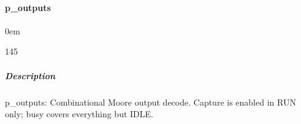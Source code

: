 \documentclass[letterpaper,10pt,english]{sphinxmanual}
\begin{document}
\sphinxstepscope


\paragraph{p\_outputs}
\label{\detokenize{modules/sample_ctrl/processes/p_outputs:p-outputs}}\label{\detokenize{modules/sample_ctrl/processes/p_outputs::doc}}
\begin{DUlineblock}{0em}
\item[]  
\item[]  145
\item[]  
\item[]  
\end{DUlineblock}


\subparagraph{Description}
\label{\detokenize{modules/sample_ctrl/processes/p_outputs:description}}
\sphinxAtStartPar
p\_outputs: Combinational Moore output decode.
Capture is enabled in RUN only; busy covers everything but IDLE.
\end{document}
